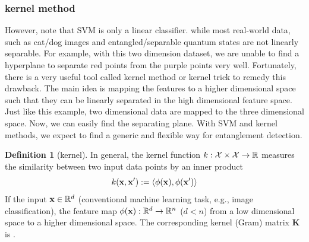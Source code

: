 \documentclass[
aps,
pra,
twocolumn,
floatfix,
]{revtex4-2}
\theoremstyle{plain}
\theoremstyle{definition}
\newtheorem{definition}{Definition}
\newcommand{\kernel}{k}
\begin{document}
\subsubsection{kernel method}
However, note that SVM is only a linear classifier. while most real-world data, such as cat/dog images and entangled/separable quantum states are not linearly separable. For example, with this two dimension dataset, we are unable to find a hyperplane to separate red points from the purple points very well. Fortunately, there is a very useful tool called kernel method or kernel trick to remedy this drawback. The main idea is mapping the features to a higher dimensional space such that  they can be linearly separated in the high dimensional feature space. Just like this example, two dimensional data are mapped to the three dimensional space. Now, we can easily find the separating plane. With SVM and kernel methods, we expect to find a generic and flexible way for entanglement detection.
\begin{definition}[kernel]\label{def:kernel}
	In general, the kernel function $\kernel:\mathcal{X}\times \mathcal{X} \to \realnumber$ measures the similarity between two input data points by an inner product
	\begin{equation}
		\kernel (\vbx,\vbx') : = \expval{\phi(\vbx),\phi(\vbx')}
	\end{equation}
	If the input $\vb{x}\in \mathbb{R}^d$ (conventional machine learning task, e.g., image classification), the feature map $\phi(\vb{x}): \mathbb{R}^d\to \mathbb{R}^n$ ($d < n$) from a low dimensional space to a higher dimensional space.
	The corresponding kernel (Gram) matrix $\mathbf{K}$ is .
\end{definition}
\end{document}
